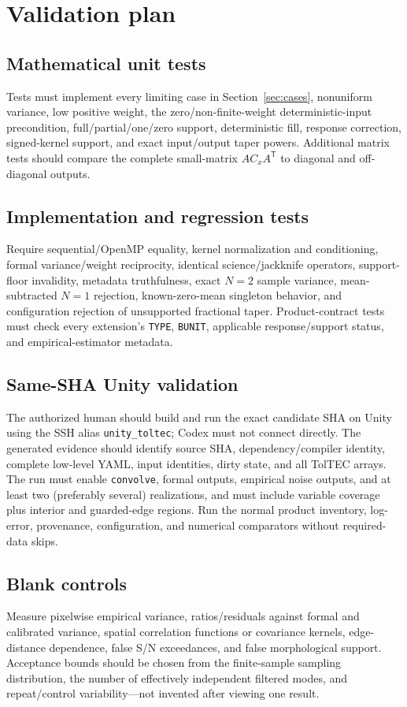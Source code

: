 \documentclass[11pt]{article}
\newcommand{\code}[1]{\nolinkurl{#1}}
\begin{document}
\section{Validation plan}
\label{sec:validation}

\subsection{Mathematical unit tests}
Tests must implement every limiting case in Section~\ref{sec:cases}, nonuniform
variance, low positive weight, the zero/non-finite-weight deterministic-input
precondition, full/partial/one/zero support, deterministic fill, response
correction, signed-kernel support, and exact input/output taper powers.
Additional matrix tests should compare the complete small-matrix
$AC_xA^{\mathsf T}$ to diagonal and off-diagonal outputs.

\subsection{Implementation and regression tests}
Require sequential/OpenMP equality, kernel normalization and conditioning,
formal variance/weight reciprocity, identical science/jackknife operators,
support-floor invalidity, metadata truthfulness, exact $N=2$ sample variance,
mean-subtracted $N=1$ rejection, known-zero-mean singleton behavior, and
configuration rejection of unsupported fractional taper.
Product-contract tests must check every extension's \code{TYPE}, \code{BUNIT},
applicable response/support status, and empirical-estimator metadata.

\subsection{Same-SHA Unity validation}
The authorized human should build and run the exact candidate SHA on Unity
using the SSH alias \code{unity_toltec}; Codex must not connect directly.
The generated evidence should identify source SHA, dependency/compiler
identity, complete low-level YAML, input identities, dirty state, and all
TolTEC arrays.  The run must enable \code{convolve}, formal outputs, empirical
noise outputs, and at least two (preferably several) realizations, and must
include variable coverage plus interior and guarded-edge regions.  Run the
normal product inventory, log-error, provenance, configuration, and numerical
comparators without required-data skips.

\subsection{Blank controls}
Measure pixelwise empirical variance, ratios/residuals against formal and
calibrated variance, spatial correlation functions or covariance kernels,
edge-distance dependence, false S/N exceedances, and false morphological
support.  Acceptance bounds should be chosen from the finite-sample sampling
distribution, the number of effectively independent filtered modes, and
repeat/control variability---not invented after viewing one result.
\end{document}
